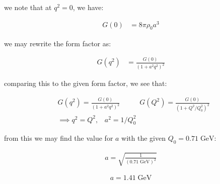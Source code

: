 \documentclass[11pt]{article}
\theoremstyle{definition}
\begin{document}
we note that at $q^2=0$, we have:

\begin{align}
    G(0) &= 8\pi\rho_0 a^3 
\end{align}

we may rewrite the form factor as: 

\begin{align}
    G(q^2) &=  \frac{G(0)}{(1+a^2q^2)^2}
\end{align}

comparing this to the given form factor, we see that:

\begin{align}
    &G(q^2) =  \frac{G(0)}{(1+a^2q^2)^2}
    \;\;\;\;\;\;\;\;\;\;
    G(Q^2) = \frac{G(0)}{(1+Q^2/Q_0^2)^2}\\
    &\implies q^2=Q^2,\;\;\; a^2 = 1/Q_0^2  
\end{align}

from this we may find the value for $a$ with the given $Q_0 = 0.71\; \text{GeV}$:

\begin{align}
    a = \sqrt{\frac{1}{(0.71\; \text{GeV})^2}}
\end{align}

\begin{equation}
\boxed{
    a = 1.41\;\text{GeV}
}
\end{equation}
\end{document}
